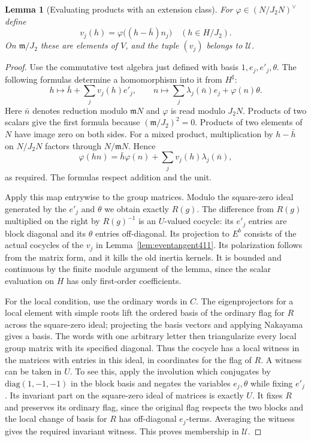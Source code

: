 \documentclass[a4paper,11pt]{article}
\newtheorem{lemma}[proposition]{Lemma}
\theoremstyle{definition}
\theoremstyle{remark}
\numberwithin{equation}{section}
\begin{document}
\begin{lemma}[Evaluating products with an extension class]\leavevmode
\label{lem:pairedproduct411}
For \(\varphi\in (N/J_2 N)^\vee\) define
\[
             v_j(h)=\varphi\big((h-\bar h)n_j\big)
                  \quad(h\in H/J_2).
\]
On \(\mathfrak m/J_2\) these are elements of \(V\), and the
tuple \((v_j)\) belongs to \(\mathcal U\).
\end{lemma}
\begin{proof}
Use the commutative test algebra just defined with basis
\(1,e_j,e'_j,\theta\). The following formulas determine a
homomorphism into it from \(H^\sharp\):
\[
 h\longmapsto\bar h+\sum_j v_j(h)e'_j,\qquad
 n\longmapsto\sum_j\lambda_j(\bar n)e_j+\varphi(n)\theta.
\]
Here \(\bar n\) denotes reduction modulo \(\mathfrak m N\)
and \(\varphi\) is read modulo \(J_2 N\). Products of two
scalars give the first formula because \((\mathfrak m/J_2)^2=0\).
Products of two elements of \(N\) have image zero on
both sides. For a mixed product, multiplication by
\(h-\bar h\) on \(N/J_2 N\) factors through
\(N/\mathfrak m N\). Hence
\[
 \varphi(hn)=\bar h\varphi(n)
                  +\sum_j v_j(h)\lambda_j(\bar n),
\]
as required. The formulas respect addition and the unit.

Apply this map entrywise to the group matrices. Modulo the
square-zero ideal generated by the \(e'_j\) and \(\theta\)
we obtain exactly \(R(g)\). The difference from \(R(g)\)
multiplied on the right by \(R(g)^{-1}\) is an
\(U\)-valued cocycle: its \(e'_j\) entries are block diagonal
and its \(\theta\) entries off-diagonal. Its projection to
\(E^b\) consists of the actual cocycles of the \(v_j\) in
Lemma~\ref{lem:eventangent411}. Its polarization follows
from the matrix form, and it kills the old inertia kernels.
It is bounded and continuous by the finite module argument
of the lemma, since the scalar evaluation on \(H\) has only
first-order coefficients.

For the local condition, use the ordinary words in \(C\).
The eigenprojectors for a local element with simple roots
lift the ordered basis of the ordinary flag for \(R\)
across the square-zero ideal; projecting the basis vectors
and applying Nakayama gives a basis. The words with one
arbitrary letter then triangularize every local group matrix
with its specified diagonal. Thus the cocycle has a local
witness in the matrices with entries in this ideal, in
coordinates for the flag of \(R\). A witness can be taken
in \(U\). To see this, apply the involution which conjugates
by \(\mathrm{diag}(1,-1,-1)\) in the block basis and negates
the variables \(e_j,\theta\) while fixing \(e'_j\).
Its invariant part on the square-zero ideal of matrices
is exactly \(U\). It fixes \(R\) and preserves its ordinary
flag, since the original flag respects the two blocks and
the local change of basis for \(R\) has off-diagonal
\(e_j\)-terms. Averaging the witness gives the required
invariant witness. This proves membership in \(\mathcal U\).
\end{proof}
\end{document}
